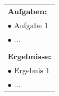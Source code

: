 \begin{table}[!h]
\begin{center}
\begin{tabular}{|p{35mm}||p{55mm}|p{50mm}||p{40mm}|}
   \multicolumn{4}{|p{150mm}|}{\textbf{Aufgaben:}}\\
   \multicolumn{4}{|p{150mm}|}{$\bullet$ Aufgabe 1}\\
   \multicolumn{4}{|p{150mm}|}{$\bullet$ ...}\\
   \multicolumn{4}{|p{150mm}|}{}\\
   \multicolumn{4}{|p{150mm}|}{\textbf{Ergebnisse:}}\\
   \multicolumn{4}{|p{150mm}|}{$\bullet$ Ergebnis 1}\\
   \multicolumn{4}{|p{150mm}|}{$\bullet$ ...}\\
   \hline
  \end{tabular}
 \end{center}
\end{table}

\clearpage
